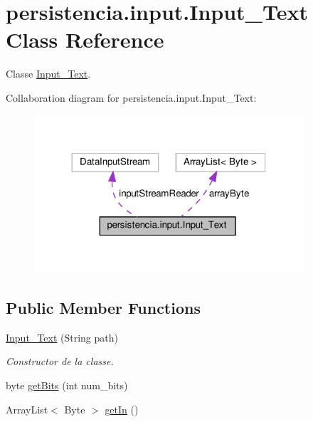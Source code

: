 \hypertarget{classpersistencia_1_1input_1_1Input__Text}{}\section{persistencia.\+input.\+Input\+\_\+\+Text Class Reference}
\label{classpersistencia_1_1input_1_1Input__Text}


Classe \hyperlink{classpersistencia_1_1input_1_1Input__Text}{Input\+\_\+\+Text}.  




Collaboration diagram for persistencia.\+input.\+Input\+\_\+\+Text\+:\nopagebreak
\begin{figure}[H]
\begin{center}
\leavevmode
\includegraphics[width=284pt]{classpersistencia_1_1input_1_1Input__Text__coll__graph}
\end{center}
\end{figure}
\subsection*{Public Member Functions}
\begin{DoxyCompactItemize}
\item 
\hyperlink{classpersistencia_1_1input_1_1Input__Text_a9027dd15a85630115b38369358defd04}{Input\+\_\+\+Text} (String path)
\begin{DoxyCompactList}\small\item\em Constructor de la classe. \end{DoxyCompactList}\item 
byte \hyperlink{classpersistencia_1_1input_1_1Input__Text_a471f357f566d79f224a9cc51967f34ef}{get\+Bits} (int num\+\_\+bits)
\item 
Array\+List$<$ Byte $>$ \hyperlink{classpersistencia_1_1input_1_1Input__Text_a36c0224f7ac8f3a60a80bacc571dd3be}{get\+In} ()
\end{DoxyCompactItemize}
